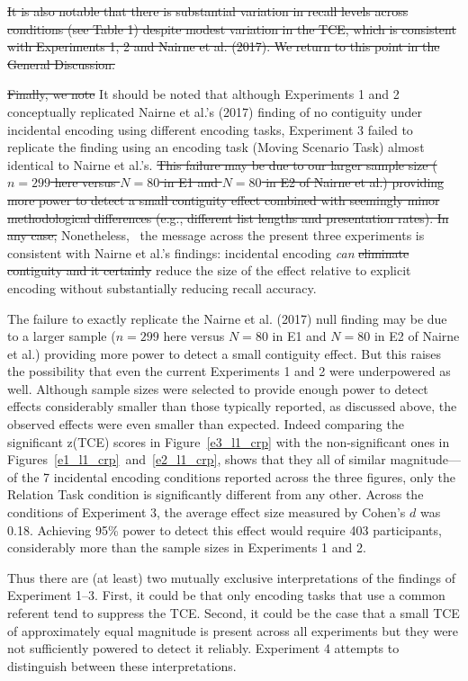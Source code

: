 \documentclass[man,natbib,floatsintext]{apa6} %
\begin{document}
\st{It is also notable that there is substantial variation in recall levels across conditions (see Table 1) despite modest variation in the TCE, which is consistent with Experiments 1, 2 and Nairne et al. (2017). We return to this point in the General Discussion.}

\st{Finally, we note} \color{red}It should be noted \color{black} that although Experiments 1 and 2 conceptually replicated Nairne et al.'s (2017) finding of no contiguity under incidental encoding using different encoding tasks, Experiment 3 failed to replicate the finding using an encoding task (Moving Scenario Task) almost identical to Nairne et al.'s. \st{This failure may be due to our larger sample size ($n=299$ here versus $N=80$ in E1 and $N=80$ in E2 of Nairne et al.) providing more power to detect a small contiguity effect combined with seemingly minor methodological differences (e.g., different list lengths and presentation rates). In any case,} \color{red}Nonetheless, \color{black}~the message across the present three experiments is consistent with Nairne et al.'s findings: incidental encoding \emph{can} \st{eliminate contiguity and it certainly} reduce the size of the effect relative to explicit encoding \color{red} without substantially reducing recall accuracy\color{black}. 

\color{red}
The failure to exactly replicate the Nairne et al. (2017) null finding may be due to a larger sample ($n=299$ here versus $N=80$ in E1 and $N=80$ in E2 of Nairne et al.) providing more power to detect a small contiguity effect. But this raises the possibility that even the current Experiments 1 and 2 were underpowered as well. Although sample sizes were selected to provide enough power to detect effects considerably smaller than those typically reported, as discussed above, the observed effects were even smaller than expected. Indeed comparing the significant z(TCE) scores in Figure~\ref{e3_l1_crp} with the non-significant ones in Figures~\ref{e1_l1_crp}~and~\ref{e2_l1_crp}, shows that they all of similar magnitude---of the 7 incidental encoding conditions reported across the three figures, only the Relation Task condition is significantly different from any other. \label{power}Across the conditions of Experiment 3, the average effect size measured by Cohen's $d$ was 0.18. Achieving 95\% power to detect this effect would require 403 participants, considerably more than the sample sizes in Experiments 1 and 2. 

Thus there are (at least) two mutually exclusive interpretations of the findings of Experiment 1--3. First, it could be that only encoding tasks that use a common referent tend to suppress the TCE. Second, it could be the case that a small TCE of approximately equal magnitude is present across all experiments but they were not sufficiently powered to detect it reliably. Experiment 4 attempts to distinguish between these interpretations.
\end{document}
